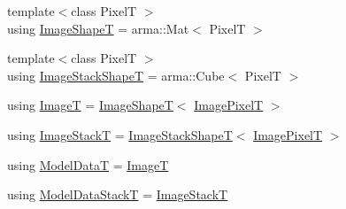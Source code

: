 \begin{DoxyCompactItemize}
{\footnotesize template$<$class PixelT $>$ }\\using \hyperlink{classmappel_1_1ImageFormat2DBase_ac40fc3773b5668601c63905876cca732}{Image\+ShapeT} = arma\+::\+Mat$<$ PixelT $>$
\item 
{\footnotesize template$<$class PixelT $>$ }\\using \hyperlink{classmappel_1_1ImageFormat2DBase_ae2e123c8a5a5ab00f89eaea04d2431cb}{Image\+Stack\+ShapeT} = arma\+::\+Cube$<$ PixelT $>$
\item 
using \hyperlink{classmappel_1_1ImageFormat2DBase_a667ea5016648958e507e7db8eaa041b0}{ImageT} = \hyperlink{classmappel_1_1ImageFormat2DBase_ac40fc3773b5668601c63905876cca732}{Image\+ShapeT}$<$ \hyperlink{classmappel_1_1ImageFormat2DBase_af6bae6f78398ab1eacb39726a05adeef}{Image\+PixelT} $>$
\item 
using \hyperlink{classmappel_1_1ImageFormat2DBase_a8f0276e94ff242fa4740a718642f5e14}{Image\+StackT} = \hyperlink{classmappel_1_1ImageFormat2DBase_ae2e123c8a5a5ab00f89eaea04d2431cb}{Image\+Stack\+ShapeT}$<$ \hyperlink{classmappel_1_1ImageFormat2DBase_af6bae6f78398ab1eacb39726a05adeef}{Image\+PixelT} $>$
\item 
using \hyperlink{classmappel_1_1PoissonNoise2DObjective_afe2da04c65d68529e79e41002d4f7827}{Model\+DataT} = \hyperlink{classmappel_1_1ImageFormat2DBase_a667ea5016648958e507e7db8eaa041b0}{ImageT}
\item 
using \hyperlink{classmappel_1_1PoissonNoise2DObjective_a889b543eb0ba9494f749a4d1b17b59b4}{Model\+Data\+StackT} = \hyperlink{classmappel_1_1ImageFormat2DBase_a8f0276e94ff242fa4740a718642f5e14}{Image\+StackT}
\end{DoxyCompactItemize}
